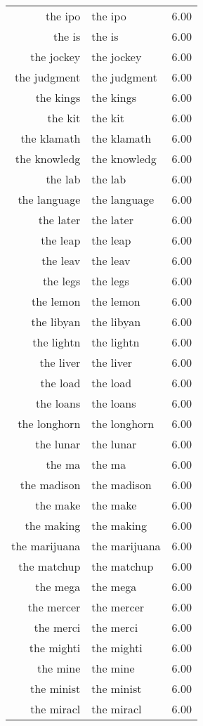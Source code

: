 \begin{table}[ht]
\begin{tabular}{rlr}
  the ipo & the ipo & 6.00 \\ 
  the is & the is & 6.00 \\ 
  the jockey & the jockey & 6.00 \\ 
  the judgment & the judgment & 6.00 \\ 
  the kings & the kings & 6.00 \\ 
  the kit & the kit & 6.00 \\ 
  the klamath & the klamath & 6.00 \\ 
  the knowledg & the knowledg & 6.00 \\ 
  the lab & the lab & 6.00 \\ 
  the language & the language & 6.00 \\ 
  the later & the later & 6.00 \\ 
  the leap & the leap & 6.00 \\ 
  the leav & the leav & 6.00 \\ 
  the legs & the legs & 6.00 \\ 
  the lemon & the lemon & 6.00 \\ 
  the libyan & the libyan & 6.00 \\ 
  the lightn & the lightn & 6.00 \\ 
  the liver & the liver & 6.00 \\ 
  the load & the load & 6.00 \\ 
  the loans & the loans & 6.00 \\ 
  the longhorn & the longhorn & 6.00 \\ 
  the lunar & the lunar & 6.00 \\ 
  the ma & the ma & 6.00 \\ 
  the madison & the madison & 6.00 \\ 
  the make & the make & 6.00 \\ 
  the making & the making & 6.00 \\ 
  the marijuana & the marijuana & 6.00 \\ 
  the matchup & the matchup & 6.00 \\ 
  the mega & the mega & 6.00 \\ 
  the mercer & the mercer & 6.00 \\ 
  the merci & the merci & 6.00 \\ 
  the mighti & the mighti & 6.00 \\ 
  the mine & the mine & 6.00 \\ 
  the minist & the minist & 6.00 \\ 
  the miracl & the miracl & 6.00 \\ 

\end{tabular}
\end{table}
